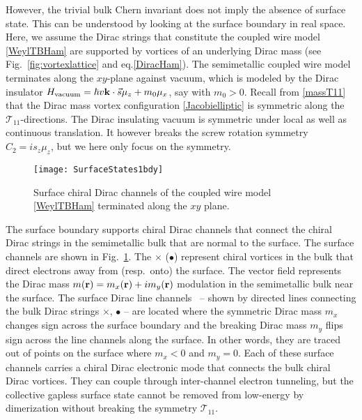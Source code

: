 However, the trivial bulk Chern invariant does not imply the absence of surface state. This can be understood by looking at the surface boundary in real space. Here, we assume the Dirac strings that constitute the coupled wire model \eqref{WeylTBHam} are supported by vortices of an underlying Dirac mass (see Fig.~\ref{fig:vortexlattice} and eq.\eqref{DiracHam}). The semimetallic coupled wire model terminates along the $xy$-plane against vacuum, which is modeled by the Dirac insulator $H_{\mathrm{vacuum}}=\hbar v{\bf k}\cdot\vec{s}\mu_z+m_0\mu_x$, say with $m_0>0$. Recall from \eqref{massT11} that the Dirac mass vortex configuration \eqref{Jacobielliptic} is \AFTR symmetric along the $\mathcal{T}_{11}$-directions. The Dirac insulating vacuum is symmetric under local \TR as well as continuous translation. It however breaks the screw rotation symmetry $\hat{C}_2=is_z\mu_z$, but we here only focus on the \AFTR symmetry.

\begin{figure}[htbp]
	\centering\texttt{[image: SurfaceStates1bdy]}
	\caption{Surface chiral Dirac channels of the coupled wire model \eqref{WeylTBHam} terminated along the $xy$ plane.}\label{fig:SurfaceStates1bdy}
\end{figure}

The surface boundary supports chiral Dirac channels that connect the chiral Dirac strings in the semimetallic bulk that are normal to the surface. The surface channels are shown in Fig.~\ref{fig:SurfaceStates1bdy}. The {\color{blue}$\times$} ({\color{red}$\bullet$}) represent chiral vortices in the bulk that direct electrons away from (resp.~onto) the surface. The vector field represents the Dirac mass $m({\bf r})=m_x({\bf r})+im_y({\bf r})$ modulation in the semimetallic bulk near the surface. The surface Dirac line channels~\cite{TeoKane} -- shown by directed lines connecting the bulk Dirac strings {\color{blue}$\times$}, {\color{red}$\bullet$} -- are located where the \TR symmetric Dirac mass $m_x$ changes sign across the surface boundary and the \TR breaking Dirac mass $m_y$ flips sign across the line channels along the surface. In other words, they are traced out of points on the surface where $m_x<0$ and $m_y=0$. Each of these surface channels carries a chiral Dirac electronic mode that connects the bulk chiral Dirac vortices. They can couple through inter-channel electron tunneling, but the collective gapless surface state cannot be removed from low-energy by dimerization without breaking the \AFTR symmetry $\mathcal{T}_{11}$. %


